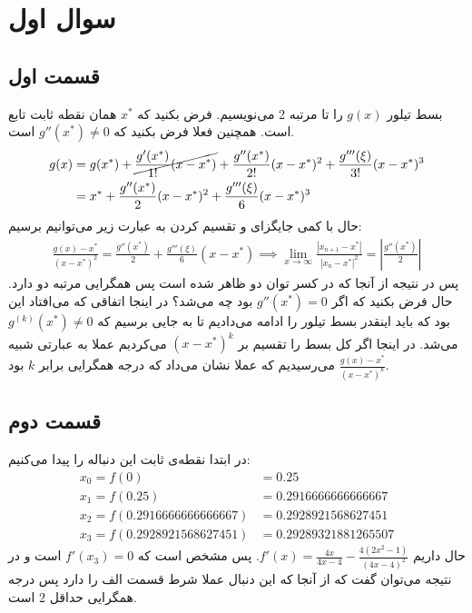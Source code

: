 \documentclass[]{article}
\begin{document}
\printheader

\section*{سوال اول}
\subsection*{قسمت اول}
بسط تیلور
$g(x)$
را تا مرتبه 2 می‌نویسیم. فرض بکنید که
$x^*$
همان نقطه ثابت تابع است. همچنین فعلا فرض بکنید که
$g''(x^*) \neq 0$
است.
\begin{align*}
    g(x) &= g(x^*) + \cancel{\frac{g'(x^*)}{1!} (x - x^*)} + \frac{g''(x^*)}{2!} (x - x^*)^2 + \frac{g'''(\xi)}{3!} (x - x^*)^3\\
    &= x^* + \frac{g''(x^*)}{2} (x - x^*)^2 + \frac{g'''(\xi)}{6} (x - x^*)^3
\end{align*}
حال با کمی جایگزای و تقسیم کردن به عبارت زیر می‌توانیم برسیم:
\begin{gather*}
    \frac{g(x) - x^*}{(x - x^*)^2} = \frac{g''(x^*)}{2} + \frac{g'''(\xi)}{6} (x - x^*)
    \implies
    \lim_{x \rightarrow \infty} \frac{|x_{n+1} - x^*|}{|x_{n} - x^*|^2} = |\frac{g''(x^*)}{2}|
\end{gather*}
پس در نتیجه از آنجا که در کسر توان دو ظاهر شده است پس همگرایی مرتبه دو دارد.
حال فرض بکنید که اگر
$g''(x^*) = 0$
بود چه می‌شد؟ در اینجا اتفاقی که می‌افتاد این بود که باید اینقدر بسط تیلور را ادامه می‌دادیم تا به
جایی برسیم که
$g^{(k)}(x^*) \neq 0$
می‌شد. در اینجا اگر کل بسط را تقسیم بر
$(x - x^*)^k$
می‌کردیم عملا به عبارتی شبیه
$\frac{g(x) - x^*}{(x - x^*)^k}$
می‌رسیدیم که عملا نشان می‌داد که درجه همگرایی برابر $k$ بود.
\subsection*{قسمت دوم}
در ابتدا نقطه‌ی ثابت این دنباله را پیدا می‌کنیم:
\begin{align*}
    x_{0} = f(0) &= 0.25\\
    x_{1} = f(0.25) &= 0.2916666666666667\\
    x_{2} = f(0.2916666666666667) &= 0.2928921568627451\\
    x_{3} = f(0.2928921568627451) &= 0.29289321881265507
\end{align*}
حال داریم
$f'(x) = \frac{4 x}{4 x -4}-\frac{4 \left(2 x^{2}-1\right)}{\left(4 x -4\right)^{2}}$.
پس مشخص است که
$f'(x_3) = 0$
است و در نتیجه می‌توان گفت که از آنجا که این دنبال عملا شرط قسمت الف را دارد پس درجه همگرایی حداقل 2 است.
\end{document}
